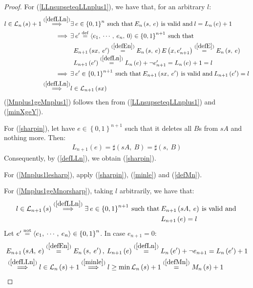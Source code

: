 \documentclass[a4paper,9pt,leqno]{article}
\renewcommand{\=}{\protect\nobreakdash-\hspace{0pt}}
\renewcommand{\~}{\protect\nobreakdash--\hspace{0pt}}
\newcommand{\textpar}{%
    \par\noindent\newline}
\theoremstyle{plain}
\theoremstyle{definition}
\theoremstyle{remark}
\newcommand{\impll}{\:\:\Longrightarrow\:\:}
\newcommand{\impl}{\impll}%
\newcommand{\parref}[1]{(\ref{#1})}
\newcommand{\by}[1]{{#1}}
\newcommand{\bydef}{\by{def}}
\newcommand{\bynot}{\by{not}}
\newcommand{\symby}[2]{\stackrel{#1}{{#2}}}
\newcommand{\symbyrm}[2]{\symby{{\rm\scriptstyle{#1}}}{#2}}
\newcommand{\implby}[1]{\symbyrm{#1}{\impll}}
\newcommand{\implbyref}[1]{\implby{\parref{#1}}}
\newcommand{\eqby}[1]{\symbyrm{#1}{=}}
\newcommand{\eqbydef}{\eqby{\bydef}}
\newcommand{\eqbyref}[1]{\eqby{\parref{#1}}}
\newcommand{\eqbynot}{\eqby{\bynot}}
\newcommand{\txt}[1]{\:\text{#1}\:}
\newcommand{\mc}{,\:}
\newcommand{\ms}{\:}
\newcommand{\lp}{\left(}
\newcommand{\lc}{\left\{}
\newcommand{\rp}{\right)}
\newcommand{\rc}{\right\}}
\newcommand{\la}{\left\langle}
\newcommand{\ra}{\right\rangle}
\begin{document}
\begin{proof}
For \parref{LLnsupseteqLLnplus1}, we have that, for an arbitrary $l$:
%
\begin{align*}
l \in \mathcal{L}_n \lp s \rp + 1
\implbyref{defLLn} & \exists\ms e \in \lc 0, 1 \rc^n \txt{such that}
    E_n \lp s\mc e \rp \txt{is valid and} l = L_n \lp e \rp + 1 \\
\impl & \exists\ms e'\eqbydef \la e_1\mc\cdots\mc e_n\mc 0\ra \in \lc 0, 1 \rc^{n+1} \txt{such that} \\
& \begin{array}{l}
    E_{n+1} \lp s x\mc e' \rp
      \eqbyref{defEn} E_n \lp s\mc e \rp E\lp x, e'_{n+1} \rp
      \eqbyref{defE} E_n \lp s\mc e \rp \\
    L_{n+1} \lp e' \rp \eqbyref{defLn} L_n \lp e \rp + \neg e'_{n+1} = L_n \lp e\rp + 1 = l
  \end{array} \\
\impl & \exists\ms e'\in \lc 0, 1 \rc^{n+1} \txt{such that}
  E_{n+1} \lp s x\mc e' \rp \txt{is valid and}
  L_{n+1} \lp e' \rp = l \\
\implbyref{defLLn} & l \in \mathcal{L}_{n+1} \lp s x \rp
\end{align*}
%
\parref{Mnplus1geMnplus1} follows then from \parref{LLnsupseteqLLnplus1} and
\parref{minXgeY}.
\textpar
For \parref{sharpin}, let have $e \in\lc 0, 1\rc^{n+1}$ such that it
deletes all $B$s from $s A$ and nothing more. Then:
%
\begin{align*}
L_{n+1}\lp e\rp = \sharp\lp s A\mc B\rp = \sharp\lp s\mc B\rp
\end{align*}
Consequently, by \parref{defLLn}, we obtain \parref{sharpin}.
\textpar
For \parref{Mnplus1lesharp}, apply \parref{sharpin}, \parref{minle} and \parref{defMn}. 
\textpar
For \parref{Mnplus1geMnorsharp}, taking $l$ arbitrarily, we have that:
%
\begin{align*}
l \in \mathcal{L}_{n+1}\lp s\rp
  \implbyref{defLLn} \exists\ms e\in\lc 0, 1\rc^{n+1} \txt{such that}
    & E_{n+1}\lp s A\mc e\rp \txt{is valid and} \\
    & L_{n+1}\lp e\rp = l
\end{align*}
%
Let $e' \eqbynot \la e_1\mc\cdots\mc e_n\ra\in\lc 0, 1\rc^n$.
In case $e_{n+1} = 0$:
%
\begin{align*}
& E_{n+1}\lp s A\mc e\rp \eqbyref{defEn} E_n\lp s\mc e'\rp\mc
  L_{n+1}\lp e\rp \eqbyref{defLn} L_n\lp e'\rp + \neg e_{n+1} = L_n\lp e'\rp + 1\\
& \implbyref{defLLn} l \in \mathcal{L}_n\lp s\rp + 1
  \implbyref{minle} l \ge \min\mathcal{L}_n\lp s\rp + 1 \eqbyref{defMn} M_n\lp s\rp + 1

\end{align*}
\end{proof}
\end{document}
